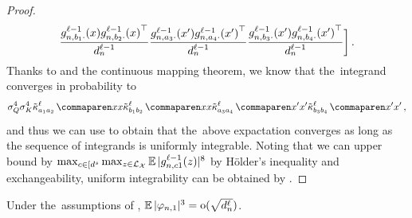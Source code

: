 \begin{proof}
\begin{align*}
            \frac{
                {g}^{\ell - 1}_{n, b_1 \cdot}{(x)}
                {g}^{\ell - 1}_{n, b_2 \cdot}{(x)}^\top
            }{d_{n}^{\ell - 1}}
            \frac{
                {g}^{\ell - 1}_{n, a_3 \cdot}{(x')}
                {g}^{\ell - 1}_{n, a_4 \cdot}{(x')}^\top
            }{d_{n}^{\ell - 1}}
            \frac{
                {g}^{\ell - 1}_{n, b_3 \cdot}{(x')}
                {g}^{\ell - 1}_{n, b_4 \cdot}{(x')}^\top
            }{d_{n}^{\ell - 1}}
        \biggr]
        \, .
    \end{align*}
    Thanks to  and the continuous mapping theorem, we know that the~integrand converges in probability to
    \begin{equation*}
        \queryStd^4 \keyStd^4
        \kerntildef{a_1 a_2}{\depthSymbol}{\inputSymbol}{\inputSymbol}
        \kerntildef{b_1 b_2}{\depthSymbol}{\inputSymbol}{\inputSymbol}
        \kerntildef{a_3 a_4}{\depthSymbol}{\inputSymbol'}{\inputSymbol'}
        \kerntildef{b_3 b_4}{\depthSymbol}{\inputSymbol'}{\inputSymbol'}
        \, ,
    \end{equation*}
    and thus we can use  to obtain that the~above expactation converges as long as the sequence of integrands is uniformly integrable.
    Noting that we can upper bound by $\max_{c \in [d^s} \max_{z \in \mathcal{L}_{\mathcal{X}}} \operatorname*{\mathbb{E}} | {g}^{\ell - 1}_{n, c 1}{(z)} |^8$ by H{\" o}lder's inequality and exchangeability, uniform integrability can be obtained by .
\end{proof}

\begin{lemma}\label{lem:logit_third_moments}
    Under the~assumptions of , $\operatorname*{\mathbb{E}} | \varphi_{n, 1} |^3 = \mathrm{o}(\sqrt{d_{n}^{\ell}})$.
\end{lemma}

